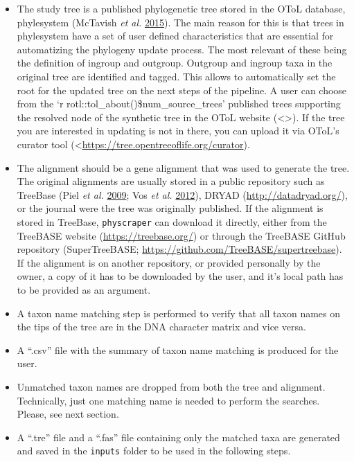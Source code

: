 \documentclass[]{article}
\providecommand{\tightlist}{%
  \setlength{\itemsep}{0pt}\setlength{\parskip}{0pt}}
\begin{document}
\begin{itemize}
\tightlist
\item
  The study tree is a published phylogenetic tree stored in the OToL database, phylesystem (McTavish \emph{et al.} \protect\hyperlink{ref-mctavish2015phylesystem}{2015}). The main
  reason for this is that trees in phylesystem have a set of user defined characteristics
  that are essential for automatizing the phylogeny update process. The most relevant of these being the definition of ingroup and outgroup. Outgroup and ingroup taxa in the original tree are identified and tagged. This allows to automatically set the root for the updated tree on the next steps of the pipeline.
  A user can choose from the `r rotl::tol\_about()\$num\_source\_trees' published trees supporting the resolved node of the synthetic tree in the OToL website (\textless{}\textgreater{}). If the tree you are interested in updating is not in there, you can upload it via OToL's curator tool (\textless{}\url{https://tree.opentreeoflife.org/curator}).
\item
  The alignment should be a gene alignment that was used to generate the tree. The original
  alignments are usually stored in a public repository such as TreeBase (Piel \emph{et al.} \protect\hyperlink{ref-piel2009treebase}{2009}; Vos \emph{et al.} \protect\hyperlink{ref-vos2012nexml}{2012}),
  DRYAD (\url{http://datadryad.org/}), or the journal were the tree was originally published.
  If the alignment is stored in TreeBase, \texttt{physcraper} can download it directly,
  either from the TreeBASE website (\url{https://treebase.org/})
  or through the TreeBASE GitHub repository (SuperTreeBASE; \url{https://github.com/TreeBASE/supertreebase}).
  If the alignment is on another repository, or provided personally by the owner, a copy of it has to be
  downloaded by the user, and it's local path has to be provided as an argument.
\item
  A taxon name matching step is performed to verify that all taxon names on the tips
  of the tree are in the DNA character matrix and vice versa.
\item
  A ``.csv'' file with the summary of taxon name matching is produced for the user.
\item
  Unmatched taxon names are dropped from both the tree and alignment.
  Technically, just one matching name is needed to perform the searches. Please, see next section.
\item
  A ``.tre'' file and a ``.fas'' file containing only the matched taxa are generated and saved in the \texttt{inputs} folder to be used in the following steps.
\end{itemize}
\end{document}
